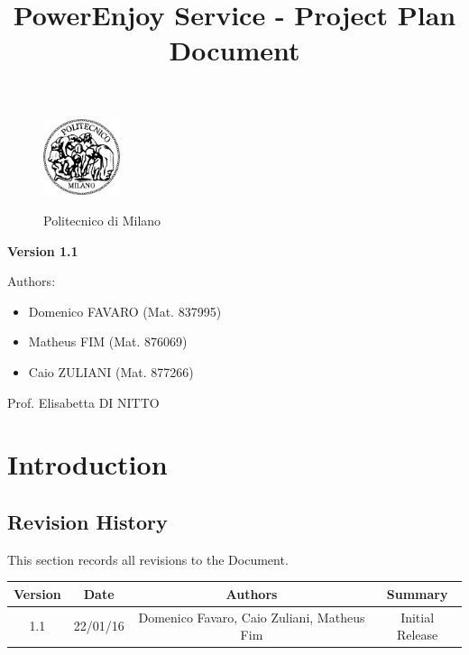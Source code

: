 \documentclass[a4paper]{article}
\title{PowerEnjoy Service - Project Plan Document}
\begin{document}
\begin{titlepage}
\begin{figure}
\centering
\includegraphics[width=0.2\textwidth]{polimi.jpg}
\par
\LARGE Politecnico di Milano
\end{figure}


\maketitle
\textbf{Version 1.1}
\newline

\raggedright
Authors:
\begin{itemize}
	\item Domenico FAVARO (Mat. 837995)
        	\item Matheus FIM (Mat. 876069)
	\item Caio ZULIANI (Mat. 877266)	
\end{itemize}
\raggedleft
Prof. Elisabetta DI NITTO
\thispagestyle{empty}
\end{titlepage}

\tableofcontents
\newpage
 
\section{Introduction}
\subsection{Revision History}
This section records all revisions to the Document.
\newline \newline
\begin{tabular}{ | c | c | c | c | }
\hline
	Version & Date & Authors & Summary \\ \hline
	1.1 & 22/01/16 & Domenico Favaro, Caio Zuliani, Matheus Fim & Initial Release  \\ \hline
\end{tabular}
\end{document}
